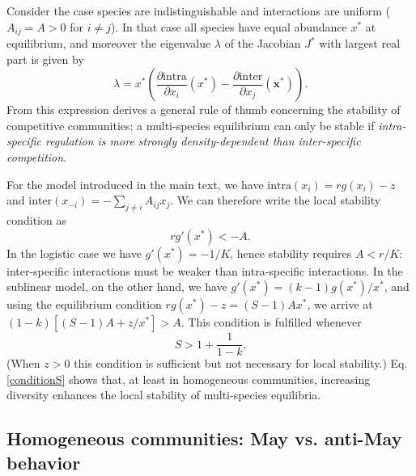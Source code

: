 \documentclass[12pt]{article}
\newcommand{\inter}{\textrm{inter}}
\newcommand{\intra}{\textrm{intra}}
\begin{document}
Consider the case species are indistinguishable and interactions are uniform ($A_{ij} = A>0$ for $i\neq j$). In that case all species have equal abundance $x^*$ at equilibrium, and moreover the eigenvalue $\lambda$ of the Jacobian $J^*$ with largest real part is given by
\begin{equation}
    \lambda = x^* \left(\frac{\partial \intra}{\partial x_i}(x^*) - \frac{\partial \inter}{\partial x_j}(\mathbf x^*)\right). 
\end{equation}
From this expression derives a general rule of thumb concerning the stability of competitive communities: a multi-species equilibrium can only be stable if \emph{intra-specific regulation is more strongly density-dependent than inter-specific competition}. 

For the model introduced in the main text, we have $\intra(x_i) = rg(x_i) -z$ and $\inter(x_{-i}) = -\sum_{j\neq i}A_{ij} x_j$. We can therefore write the local stability condition as
\begin{equation}
    rg'(x^*) < - A.
\end{equation}
In the logistic case we have $g'(x^*) = -1/K$, hence stability requires $A < r/K$: inter-specific interactions must be weaker than intra-specific interactions. In the sublinear model, on the other hand, we have $g'(x^*) = (k-1)g(x^*)/x^*$, and using the equilibrium condition $rg(x^*) - z = (S-1)Ax^*$, we arrive at $(1-k)[(S-1)A + z/x^*] > A$. This condition is fulfilled whenever 
\begin{equation}\label{conditionS}
    S > 1 + \frac{1}{1-k}.
\end{equation}
(When $z > 0$ this condition is sufficient but not necessary for local stability.) Eq. \eqref{conditionS} shows that, at least in homogeneous communities, increasing diversity enhances the local stability of multi-species equilibria. 

\subsection{Homogeneous communities: May vs. anti-May behavior}
\end{document}
